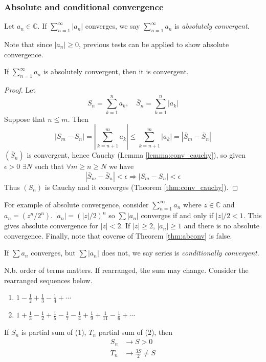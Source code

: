 \documentclass[10pt, a4paper, twoside]{report}
\begin{document}
\subsubsection{Absolute  and conditional convergence}
\begin{definition}
    Let \(a_n\in\mathbb{C}\). If \(\sum_{n=1}^{\infty}|a_n|\) converges, we say \(\sum_{n=1}^\infty a_n\) is \emph{absolutely convergent}.
\end{definition}
Note that since \(|a_n|\geq 0\), previous tests can be applied to show absolute convergence.
\begin{theorem}
    If \(\sum_{n=1}^{\infty}a_n\) is absolutely convergent, then it is convergent.
    \label{thm:abconv}
\end{theorem}
\begin{proof}
    Let
    \[S_n=\sum_{k=1}^{n}a_k,\quad\bar{S}_n=\sum_{k=1}^{n}|a_k|\]
    Suppose that \(n\leq m\). Then
    \[|S_m-S_n|=\left|\sum_{k=n+1}^{m}a_k\right|\leq\sum_{k=n+1}^{m}|a_k|=|\bar{S}_m-\bar{S}_n|\]
    \((\bar{S}_n)\) is convergent, hence Cauchy (Lemma \ref{lemma:conv_cauchy}), so given \(\epsilon>0\) \(\exists N\) such that \(\forall m\geq n\geq N\) we have 
    \[|\bar{S}_m-\bar{S}_n|<\epsilon\Rightarrow|S_m-S_n|<\epsilon\]
    Thus \((S_n)\) is Cauchy and it converges (Theorem \ref{thm:conv_cauchy}).
\end{proof}
For example of absolute convergence, consider \(\sum_{n=1}^{\infty}a_n\) where \(z\in\mathbb{C}\) and \(a_n=(z^n/2^n)\). \(|a_n|=(|z|/2)^n\) so \(\sum|a_n|\) converges if and only if \(|z|/2<1\). This gives absolute convergence for \(|z|<2\). If \(|z|\geq 2\), \(|a_n|\geq 1\) and there is no absolute convergence. Finally, note that coverse of Theorem \ref{thm:abconv} is false. 
\begin{definition}
    If \(\sum a_n\) converges, but \(\sum|a_n|\) does not, we say series is \emph{conditionally convergent}. 
\end{definition}
N.b. order of terms matters. If rearranged, the sum may change. Consider the rearranged sequences below.
\begin{enumerate}
    \item \(1-\frac 12+\frac 13-\frac 14+\cdots\)
    \item \(1+\frac 13-\frac 12+\frac 15-\frac 17-\frac 14+\frac 19+\frac 1{11}-\frac 16+\cdots\)
\end{enumerate}
If \(S_n\) is partial sum of (1), \(T_n\) partial sum of (2), then
\begin{align*}
    S_n&\to S>0 \\
    T_n&\to\frac{3S}{2}\neq S
\end{align*}
\end{document}
